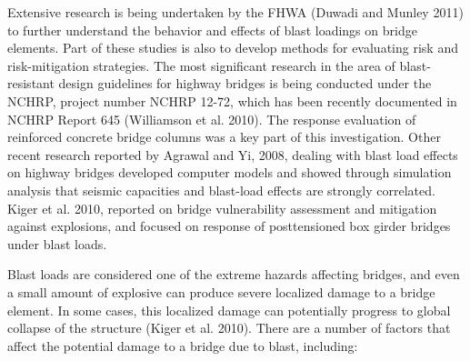 Extensive research is being undertaken by the FHWA (Duwadi and Munley 2011) to further understand the
behavior and effects of blast loadings on bridge elements. Part of these studies is also to develop methods for
evaluating risk and risk-mitigation strategies. The most significant research in the area of blast-resistant design
guidelines for highway bridges is being conducted under the NCHRP, project number NCHRP 12-72, which has been
recently documented in NCHRP Report 645 (Williamson et al. 2010). The response evaluation of reinforced
concrete bridge columns was a key part of this investigation. Other recent research reported by Agrawal and Yi,
2008, dealing with blast load effects on highway bridges developed computer models and showed through simulation
analysis that seismic capacities and blast-load effects are strongly correlated. Kiger et al. 2010, reported on bridge
vulnerability assessment and mitigation against explosions, and focused on response of posttensioned box girder
bridges under blast loads.

Blast loads are considered one of the extreme hazards affecting bridges, and even a small amount of explosive
can produce severe localized damage to a bridge element. In some cases, this localized damage can potentially
progress to global collapse of the structure (Kiger et al. 2010). There are a number of factors that affect the potential
damage to a bridge due to blast, including:


